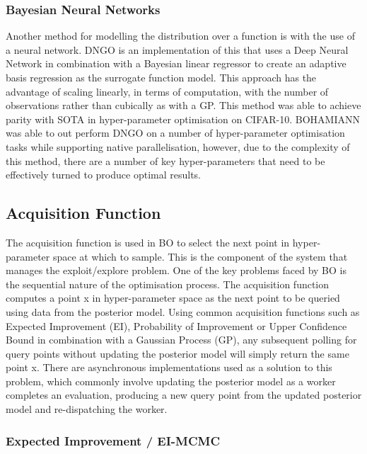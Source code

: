 \documentclass{article}
\begin{document}
		\subsubsection{Bayesian Neural Networks}

			Another method for modelling the distribution over a function is with the use of a neural network. DNGO \cite{22} is an implementation of this that uses a Deep Neural Network in combination with a Bayesian linear regressor to create an adaptive basis regression as the surrogate function model. This approach has the advantage of scaling linearly, in terms of computation, with the number of observations rather than cubically as with a GP. This method was able to achieve parity with SOTA in hyper-parameter optimisation on CIFAR-10. BOHAMIANN \cite{40} was able to out perform DNGO on a number of hyper-parameter optimisation tasks while supporting native parallelisation, however, due to the complexity of this method, there are a number of key hyper-parameters that need to be effectively turned to produce optimal results.




	\subsection {Acquisition Function}

		The acquisition function is used in BO to select the next point in hyper-parameter space at which to sample. This is the component of the system that manages the exploit/explore problem. One of the key problems faced by BO is the sequential nature of the optimisation process. The acquisition function computes a point x in hyper-parameter space as the next point to be queried using data from the posterior model. Using common acquisition functions such as Expected Improvement (EI), Probability of Improvement or Upper Confidence Bound in combination with a Gaussian Process (GP), any subsequent polling for query points without updating the posterior model will simply return the same point x.
		There are asynchronous implementations used as a solution to this problem, which commonly involve updating the posterior model as a worker completes an evaluation, producing a new query point from the updated posterior model and re-dispatching the worker. \cite{26}\cite{27}\cite{20}



		\subsubsection{Expected Improvement / EI-MCMC}
\end{document}
